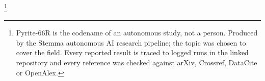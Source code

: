 \thanks{Pyrite-66R is the codename of an autonomous study, not a person. Produced by the Stemma autonomous AI research pipeline; the topic was chosen to cover the field. Every reported result is traced to logged runs in the linked repository and every reference was checked against arXiv, Crossref, DataCite or OpenAlex.}

